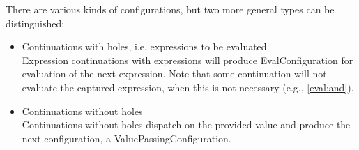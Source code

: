 \documentclass[a4paper,oneside]{article}
\begin{document}
There are various kinds of configurations, but two more general types can be distinguished:

\begin{itemize}
    \item Continuations with holes, i.e. expressions to be evaluated\\
        Expression continuations with expressions will produce EvalConfiguration for evaluation of the next expression.
        Note that some continuation will not evaluate the captured expression, when this is not necessary (e.g., \eqref{eval:and}).

    \item Continuations without holes\\
        Continuations without holes dispatch on the provided value and produce the next configuration, a ValuePassingConfiguration.

\end{itemize}
\end{document}

